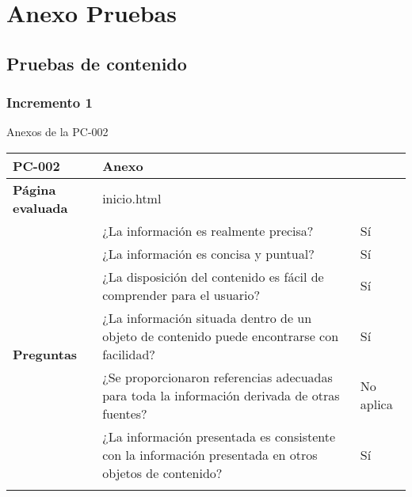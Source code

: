 \chapter{Anexo Pruebas}

\section{Pruebas de contenido}

\subsection{Incremento 1}

Anexos de la PC-002

\begin{table}[htpb]
\centering
\begin{tabularx}{\textwidth}{|l|X|l|}
\hline
\rowcolor[gray]{0.9}\textbf{PC-002}                       & \multicolumn{2}{l|}{Anexo}                                                                                                \\ \hline
\textbf{Página evaluada}             & \multicolumn{2}{l|}{inicio.html}                                                                                          \\ \hline
\multirow{10}{*}{\textbf{Preguntas}} & ¿La información es realmente precisa?                                                                         & Sí        \\ \cline{2-3} 
                                     & ¿La información es concisa y puntual?                                                                         & Sí        \\ \cline{2-3} 
                                     & ¿La disposición del contenido es fácil de comprender para el usuario?                                         & Sí        \\ \cline{2-3} 
                                     & ¿La información situada dentro de un objeto de contenido puede encontrarse con facilidad?                     & Sí        \\ \cline{2-3} 
                                     & ¿Se proporcionaron referencias adecuadas para toda la información derivada de otras fuentes?                  & No aplica \\ \cline{2-3} 
                                     & ¿La información presentada es consistente con la información presentada en otros objetos de contenido?        & Sí        \\ \cline{2-3} 

\end{tabularx}
\end{table}
